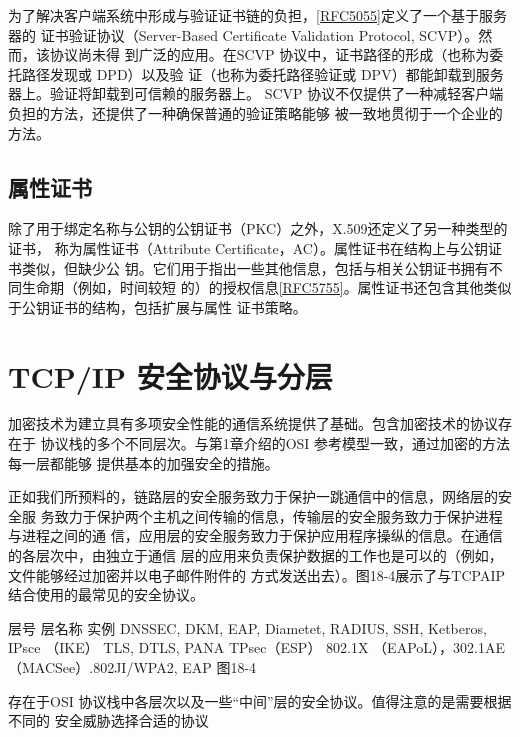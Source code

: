 为了解决客户端系统中形成与验证证书链的负担，\href{https://www.rfc-editor.org/rfc/rfc5055}{[RFC5055]}定义了一个基于服务器的
证书验证协议（Server-Based Certificate Validation Protocol, SCVP）。然而，该协议尚未得
到广泛的应用。在SCVP 协议中，证书路径的形成（也称为委托路径发现或 DPD）以及验
证（也称为委托路径验证或 DPV）都能卸载到服务器上。验证将卸载到可信赖的服务器上。
SCVP 协议不仅提供了一种减轻客户端负担的方法，还提供了一种确保普通的验证策略能够
被一致地贯彻于一个企业的方法。

\subsection{属性证书}

除了用于绑定名称与公钥的公钥证书（PKC）之外，X.509还定义了另一种类型的证书，
称为属性证书（Attribute Certificate，AC）。属性证书在结构上与公钥证书类似，但缺少公
钥。它们用于指出一些其他信息，包括与相关公钥证书拥有不同生命期（例如，时间较短
的）的授权信息\href{https://www.rfc-editor.org/rfc/rfc5755}{[RFC5755]}。属性证书还包含其他类似于公钥证书的结构，包括扩展与属性
证书策略。

\section{TCP/IP 安全协议与分层}
加密技术为建立具有多项安全性能的通信系统提供了基础。包含加密技术的协议存在于
协议栈的多个不同层次。与第1章介绍的OSI 参考模型一致，通过加密的方法每一层都能够
提供基本的加强安全的措施。

正如我们所预料的，链路层的安全服务致力于保护一跳通信中的信息，网络层的安全服
务致力于保护两个主机之间传输的信息，传输层的安全服务致力于保护进程与进程之间的通
信，应用层的安全服务致力于保护应用程序操纵的信息。在通信的各层次中，由独立于通信
层的应用来负责保护数据的工作也是可以的（例如，文件能够经过加密并以电子邮件附件的
方式发送出去）。图18-4展示了与TCPAIP结合使用的最常见的安全协议。

层号
层名称
实例
DNSSEC, DKM, EAP, Diametet, RADIUS, SSH, Ketberos, IPsce （IKE）
TLS, DTLS, PANA
TPsec（ESP）
802.1X （EAPoL），302.1AE （MACSee）.802JI/WPA2, EAP
图18-4

存在于OSI 协议栈中各层次以及一些“中间”层的安全协议。值得注意的是需要根据不同的
安全威胁选择合适的协议

